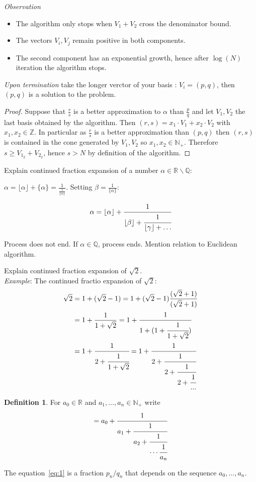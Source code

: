 \documentclass[a4paper,11pt,american]{article}
\newcommand{\N}{\mathbb{N}}
\newcommand{\Q}{\mathbb{Q}}
\newcommand{\R}{\mathbb{R}}
\newcommand{\Z}{\mathbb{Z}}
\theoremstyle{plain}
\theoremstyle{definition}
\newtheorem{definition}{Definition}
\begin{document}
\emph{Observation}\begin{itemize}
    \item The algorithm only stops when $V_1+V_2$ cross the denominator bound.
    \item The vectors $V_i,V_j$ remain positive in both components.
    \item The second component has an exponential growth, hence after $\log(N)$ iteration the algorithm stops.
\end{itemize}
\emph{Upon termination} take the longer verctor of your basis : $V_i=(p,q)$, then $(p,q)$ is a solution to the problem.
\begin{proof}
    Suppose that $\frac{r}{s}$ is a better approximation to $\alpha$ than $\frac{p}{q}$ and let $V_1,V_2$ the last basis obtained by the algorithm. Then $(r,s)=x_1\cdot V_1+ x_2\cdot V_2$ with $x_1,x_2\in\Z$. In particular as $\frac{r}{s}$ is a better approximation than $(p,q)$ then $(r,s)$ is contained in the cone generated by $V_1,V_2$ so $x_1,x_2\in \N_+$. Therefore $s\geq V_{1_2}+V_{2_2}$, hence $s>N$ by definition of the algorithm. 
\end{proof}
Explain  continued fraction expansion of a number $\alpha\in\R\backslash \Q$:

$\alpha =  \lfloor\alpha\rfloor + \{\alpha\}=\frac{1}{\frac{1}{\{\alpha\}}} $. Setting $\beta = \frac{1}{\{\alpha\}}$:
 
  \begin{displaymath}
    \alpha = \lfloor\alpha\rfloor + \cfrac{1}{ \lfloor\beta\rfloor + \cfrac{1}{\lfloor\gamma\rfloor+ \dots}} 
  \end{displaymath}

  Process does not end. If $\alpha \in\Q$, process ends. Mention relation to Euclidean algorithm.

  Explain continued fraction expansion of $\sqrt{2}$.\\
\emph{Example}: The continued fractio expansion of $\sqrt{2}$:\begin{align*}
    \sqrt{2}&=1+(\sqrt{2}-1)=1+(\sqrt{2}-1)\dfrac{(\sqrt{2}+1)}{(\sqrt{2}+1)}\\
    &=1+\dfrac{1}{1+\sqrt{2}}=1+\cfrac{1}{1+(1+\cfrac{1}{1+\sqrt{2}})}\\
    &=1+\cfrac{1}{2+\cfrac{1}{1+\sqrt{2}}}=1+\cfrac{1}{2+\cfrac{1}{2+\cfrac{1}{2+\cfrac{1}{...}}}}
\end{align*}

  \begin{definition}
    For $a_0 \in \R$ and $a_1,\dots,a_n \in\N_+$ write
    \begin{equation}      
      [a_0;a_1,\dots,a_n] = a_0 + \cfrac{1}{a_1 + \cfrac{1}{a_2 + \cfrac{1}{\cdots  \cfrac{1}{a_n}}}}
      \label{eq:1}
    \end{equation}
  \end{definition}
The equation~\eqref{eq:1} is a fraction $p_n / q_n$ that depends on the sequence $a_0,\dots,a_n$.
\end{document}
